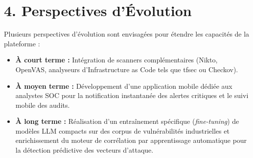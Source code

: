 \section*{4. Perspectives d'\'Evolution}
\par Plusieurs perspectives d'\'evolution sont envisag\'ees pour \'etendre les capacit\'es de la plateforme :
\begin{itemize}
    \item \textbf{\`A court terme :} Int\'egration de scanners compl\'ementaires (Nikto, OpenVAS, analyseurs d'Infrastructure as Code tels que tfsec ou Checkov).
    \item \textbf{\`A moyen terme :} D\'eveloppement d'une application mobile d\'edi\'ee aux analystes SOC pour la notification instantan\'ee des alertes critiques et le suivi mobile des audits.
    \item \textbf{\`A long terme :} R\'ealisation d'un entra\^inement sp\'ecifique (\textit{fine-tuning}) de mod\`eles LLM compacts sur des corpus de vuln\'erabilit\'es industrielles et enrichissement du moteur de corr\'elation par apprentissage automatique pour la d\'etection pr\'edictive des vecteurs d'attaque.
\end{itemize}
